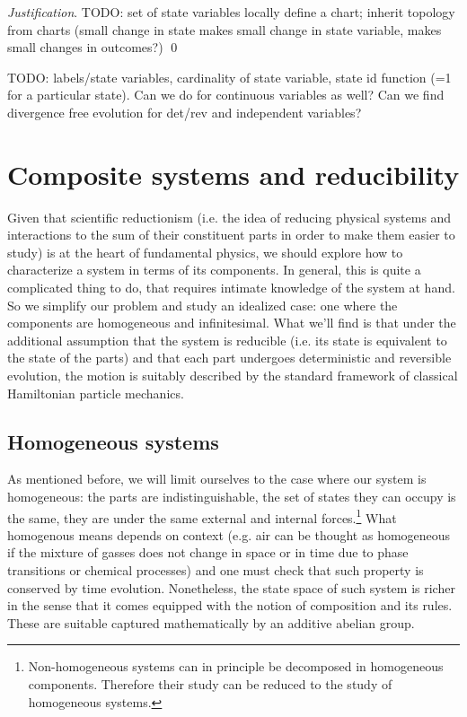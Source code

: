 \documentclass[aps,pra,10pt,twocolumn,floatfix,nofootinbib]{revtex4-1}
\theoremstyle{definition}
\newenvironment{justification}{\emph{Justification}.}{\qed}
\begin{document}
\begin{justification}
TODO: set of state variables locally define a chart; inherit topology from charts (small change in state makes small change in state variable, makes small changes in outcomes?)
\end{justification}


TODO: labels/state variables, cardinality of state variable, state id function (=1 for a particular state). Can we do for continuous variables as well? Can we find divergence free evolution for det/rev and independent variables?

\section{Composite systems and reducibility}

Given that scientific reductionism (i.e. the idea of reducing physical systems and interactions to the sum of their constituent parts in order to make them easier to study) is at the heart of fundamental physics, we should explore how to characterize a system in terms of its components. In general, this is quite a complicated thing to do, that requires intimate knowledge of the system at hand. So we simplify our problem and study an idealized case: one where the components are homogeneous and infinitesimal. What we'll find is that under the additional assumption that the system is reducible (i.e. its state is equivalent to the state of the parts) and that each part undergoes deterministic and reversible evolution, the motion is suitably described by the standard framework of classical Hamiltonian particle mechanics.

\subsection{Homogeneous systems}
As mentioned before, we will limit ourselves to the case where our system is homogeneous: the parts are indistinguishable, the set of states they can occupy is the same, they are under the same external and internal forces.\footnote{Non-homogeneous systems can in principle be decomposed in homogeneous components. Therefore their study can be reduced to the study of homogeneous systems.} What homogenous means depends on context (e.g. air can be thought as homogeneous if the mixture of gasses does not change in space or in time due to phase transitions or chemical processes) and one must check that such property is conserved by time evolution. Nonetheless, the state space of such system is richer in the sense that it comes equipped with the notion of composition and its rules. These are suitable captured mathematically by an additive abelian group.
\end{document}
